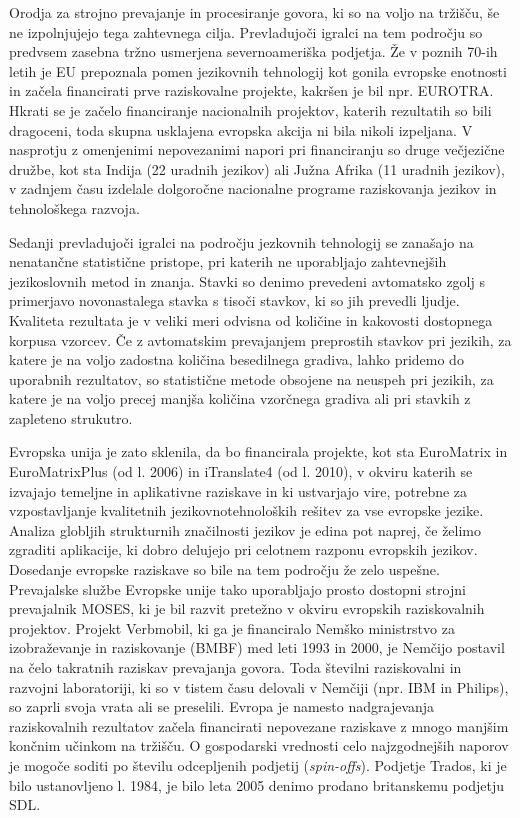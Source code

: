 \begin{multicols}{2}
Orodja za strojno prevajanje in procesiranje govora, ki so na voljo na tržišču, še ne izpolnjujejo tega zahtevnega cilja. Prevladujoči igralci na tem področju so predvsem zasebna tržno usmerjena severno\-ameriška podjetja. Že v poznih 70-ih letih je EU prepoznala pomen jezikovnih tehnologij kot gonila evropske enotnosti in začela financirati prve raziskovalne projekte, kakršen je bil npr. EUROTRA. Hkrati se je začelo financiranje nacionalnih projektov, katerih rezultatih so bili dragoceni, toda skupna usklajena evropska akcija ni bila nikoli izpeljana. V nasprotju z omenjenimi nepovezanimi napori pri financiranju so druge večjezične družbe, kot sta Indija (22 uradnih jezikov) ali Južna Afrika (11 uradnih jezikov), v zadnjem času izdelale dolgoročne nacionalne programe raziskovanja jezikov in tehnološkega razvoja.


Sedanji prevladujoči igralci na področju jezkovnih tehnologij se zanašajo na nenatančne statistične pristope, pri katerih ne uporabljajo zahtevnej\-ših jezikoslovnih metod in znanja. Stavki so denimo prevedeni avtomatsko zgolj s primerjavo novonastalega stavka s tisoči stavkov, ki so jih prevedli ljudje. Kvaliteta rezultata je v veliki meri odvisna od količine in kakovosti dostopnega korpusa vzorcev. Če z avtomatskim prevajanjem preprostih stavkov pri jezikih, za katere je na voljo zadostna količina besedilnega gradiva, lahko pridemo do uporabnih rezultatov, so statistične metode obsojene na neuspeh pri jezikih, za katere je na voljo precej manjša količina vzorčnega gradiva ali pri stavkih z zapleteno strukutro.

Evropska unija je zato sklenila, da bo financirala projekte, kot sta EuroMatrix in EuroMatrixPlus (od l. 2006) in iTranslate4 (od l. 2010), v okviru katerih se izvajajo temeljne in aplikativne raziskave in ki ustvarjajo vire, potrebne za vzpostavljanje kvalitetnih jezikovnotehnoloških rešitev za vse evropske jezike. Analiza globljih strukturnih značilnosti jezikov je edina pot naprej, če želimo zgraditi aplikacije, ki dobro delujejo pri celotnem razponu evropskih jezikov. Dosedanje evropske raziskave so bile na tem področju že zelo uspešne. Prevajalske službe Evropske unije tako uporabljajo prosto dostopni strojni prevajalnik MOSES, ki je bil razvit pretežno v okviru evropskih raziskovalnih projektov. Projekt Verbmobil, ki ga je financiralo Nemško ministrstvo za izobraževanje in raziskovanje (BMBF) med leti 1993 in 2000, je Nemčijo postavil na čelo takratnih raziskav prevajanja govora. Toda številni raziskovalni in razvoj\-ni laboratoriji, ki so v tistem času delovali v Nemčiji (npr. IBM in Philips), so zaprli svoja vrata ali se preselili. Evropa je namesto nadgrajevanja raziskovalnih rezultatov začela financirati nepovezane raziskave z mnogo manjšim končnim učinkom na tržišču. O gospodarski vrednosti celo najzgodnejših naporov je mogoče soditi po številu odcepljenih podjetij (\textit{spin-offs}). Podjetje Trados, ki je bilo ustanovljeno l. 1984, je bilo leta 2005 denimo prodano britanskemu podjetju SDL.


\end{multicols}
